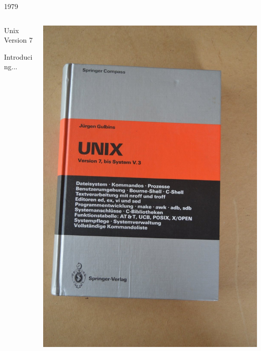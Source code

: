 \documentclass{slide}
\begin{document}
\begin{frame}{1979}
    \vspace{-3em}
    \begin{columns}
    \begin{column}{0.5\textwidth}
    {\color{primary}\large Unix Version 7}
    \vspace{1em}

    Introducing... 
    \end{column}
    \begin{column}{0.5\textwidth}
    \begin{center}
    \includegraphics[height=0.95\textheight]{images/unix7}
    \end{center}
    \end{column}
    \end{columns}
\end{frame}
\end{document}
